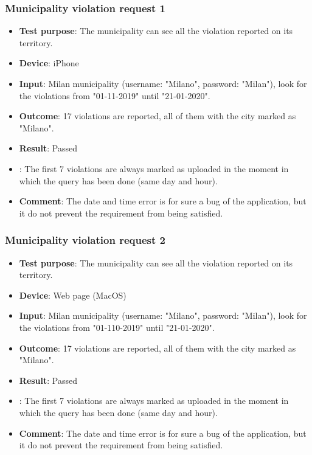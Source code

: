 \documentclass[../ATD.tex]{subfiles}
\begin{document}
    \subsubsection{Municipality violation request 1}\label{subsubsec:municiplaity-violation-request-1}
    \begin{itemize}
        \item \textbf{Test purpose}: The municipality can see all the violation reported on its territory.
        \item \textbf{Device}: iPhone
        \item \textbf{Input}: Milan municipality (username: "Milano", password: "Milan"), look for the violations from "01-11-2019" until "21-01-2020".
        \item \textbf{Outcome}: 17 violations are reported, all of them with the city marked as "Milano".
        \item \textbf{Result}: Passed
        \item {}: The first 7 violations are always marked as uploaded in the moment in which the query has been done (same day and hour).
        \item \textbf{Comment}: The date and time error is for sure a bug of the application, but it do not prevent the requirement from being satisfied.
    \end{itemize}

    \subsubsection{Municipality violation request 2}\label{subsubsec:municiplaity-violation-request-2}
    \begin{itemize}
        \item \textbf{Test purpose}: The municipality can see all the violation reported on its territory.
        \item \textbf{Device}: Web page (MacOS)
        \item \textbf{Input}: Milan municipality (username: "Milano", password: "Milan"), look for the violations from "01-110-2019" until "21-01-2020".
        \item \textbf{Outcome}: 17 violations are reported, all of them with the city marked as "Milano".
        \item \textbf{Result}: Passed
        \item {}: The first 7 violations are always marked as uploaded in the moment in which the query has been done (same day and hour).
        \item \textbf{Comment}: The date and time error is for sure a bug of the application, but it do not prevent the requirement from being satisfied.
    \end{itemize}
\end{document}
